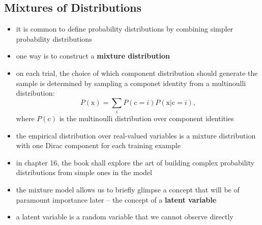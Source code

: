 \documentclass[11pt, twocolumn]{report}
\begin{document}
\subsection{Mixtures of Distributions}
\begin{itemize}
  \item it is common to define probability distributions by combining simpler
    probability distributions
  \item one way is to construct a \textbf{mixture distribution}
  \item on each trial, the choice of which component distribution should
    generate the sample is determined by sampling a componet identity from a
    multinoulli distribution:
    \begin{equation}
      P(\text{x}) = \sum_i P(\text{c} = i)P(\text{x} | \text{c} = i),
    \end{equation}
    where $P(\text{c})$ is the multinoulli distribution over component
    identities
  \item the empirical distribution over real-valued variables is a mixture
    distribution with one Dirac component for each training example
  \item in chapter 16, the book shall explore the art of building complex
    probability distributions from simple ones in the model
  \item the mixture model allows us to briefly glimpse a concept that will be
    of paramount importance later -- the concept of a \textbf{latent variable}
  \item a latent variable is a random variable that we cannot observe directly
\end{itemize}
\end{document}
